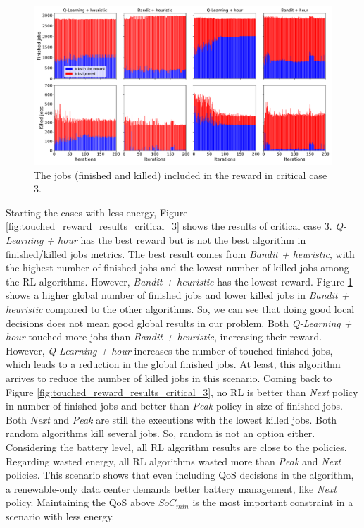 \begin{figure}[!htb]
    \centering
    \includegraphics[scale=0.33]{Images/Learning_compensations/ignored_jobs_touched_scenario_3.pdf}
    \caption{The jobs (finished and killed) included in the reward in critical case 3.}
    \label{fig:reward_from_jobs_critical_3}
\end{figure}

Starting the cases with less energy, Figure \ref{fig:touched_reward_results_critical_3} shows the results of critical case 3. \emph{Q-Learning + hour} has the best reward but is not the best algorithm in finished/killed jobs metrics. The best result comes from \emph{Bandit + heuristic}, with the highest number of finished jobs and the lowest number of killed jobs among the RL algorithms. However, \emph{Bandit + heuristic} has the lowest reward. Figure \ref{fig:reward_from_jobs_critical_3} shows a higher global number of finished jobs and lower killed jobs in \emph{Bandit + heuristic} compared to the other algorithms. So, we can see that doing good local decisions does not mean good global results in our problem. Both \emph{Q-Learning + hour} touched more jobs than \emph{Bandit + heuristic}, increasing their reward. However, \emph{Q-Learning + hour} increases the number of touched finished jobs, which leads to a reduction in the global finished jobs. At least, this algorithm arrives to reduce the number of killed jobs in this scenario. Coming back to Figure \ref{fig:touched_reward_results_critical_3}, no RL is better than \emph{Next} policy in number of finished jobs and better than \emph{Peak} policy in size of finished jobs. Both \emph{Next} and \emph{Peak} are still the executions with the lowest killed jobs. Both random algorithms kill several jobs. So, random is not an option either. Considering the battery level, all RL algorithm results are close to the policies. Regarding wasted energy, all RL algorithms wasted more than \emph{Peak} and \emph{Next} policies. This scenario shows that even including QoS decisions in the algorithm, a renewable-only data center demands better battery management, like \emph{Next} policy. Maintaining the QoS above $SoC_{min}$ is the most important constraint in a scenario with less energy.

